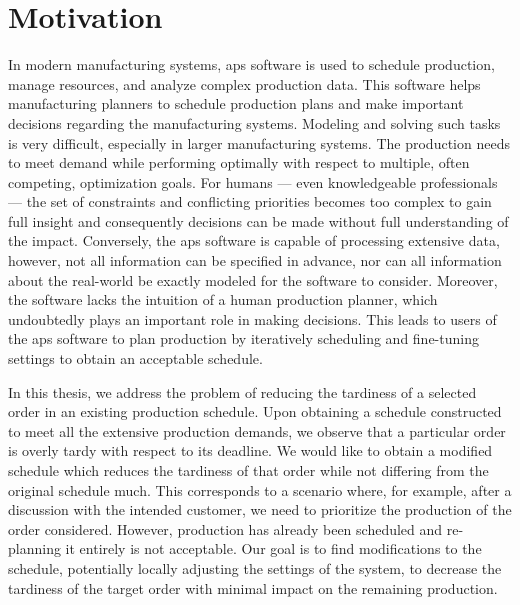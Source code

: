  \label{chap:introduction}

\section*{Motivation} \label{sec:introduction/motivation}

In modern manufacturing systems, \ac{aps} software is used to schedule production,
manage resources, and analyze complex production data.
This software helps manufacturing planners to schedule production plans
and make important decisions regarding the manufacturing systems.
Modeling and solving such tasks is very difficult, especially in larger manufacturing systems.
The production needs to meet demand while performing optimally with respect to multiple,
often competing, optimization goals.
For humans --- even knowledgeable professionals ---
the set of constraints and conflicting priorities becomes too complex to gain full insight
and consequently decisions can be made without full understanding of the impact.
Conversely, the \ac{aps} software is capable of processing extensive data,
however, not all information can be specified in advance,
nor can all information about the real-world be exactly modeled for the software to consider.
Moreover, the software lacks the intuition of a human production planner,
which undoubtedly plays an important role in making decisions.
This leads to users of the \ac{aps} software to plan production by iteratively
scheduling and fine-tuning settings to obtain an acceptable schedule.

In this thesis, we address the problem of reducing the tardiness
of a selected order in an existing production schedule.
Upon obtaining a schedule constructed to meet all the extensive production demands,
we observe that a particular order is overly tardy with respect to its deadline.
We would like to obtain a modified schedule which reduces the tardiness of that order
while not differing from the original schedule much.
This corresponds to a scenario where, for example, after a discussion with the intended customer,
we need to prioritize the production of the order considered.
However, production has already been scheduled and re-planning it entirely is not acceptable.
Our goal is to find modifications to the schedule,
potentially locally adjusting the settings of the system,
to decrease the tardiness of the target order with minimal impact on the remaining production.



